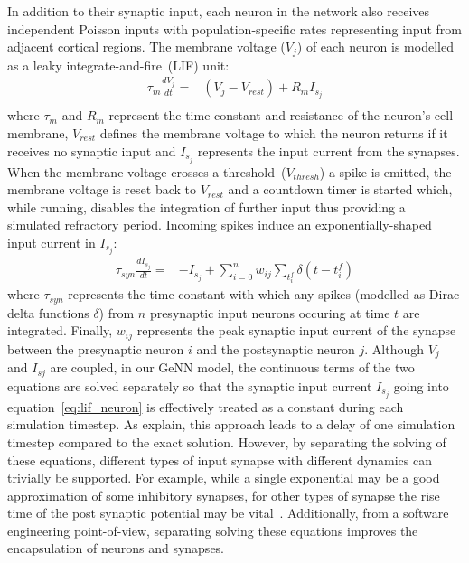\documentclass[utf8]{frontiersSCNS} %
\begin{document}
In addition to their synaptic input, each neuron in the network also receives independent Poisson inputs with population-specific rates representing input from adjacent cortical regions.
The membrane voltage ($V_{j}$) of each neuron is modelled as a leaky integrate-and-fire~(LIF) unit:
%
\begin{align}
    \tau_{m} \frac{dV_{j}}{dt} = & (V_{j} - V_{rest}) + R_{m} I_{s_{j}} \label{eq:lif_neuron}\\
\end{align}
%
where $\tau_{m}$ and $R_{m}$ represent the time constant and resistance of the neuron's cell membrane, $V_{rest}$ defines the membrane voltage to which the neuron returns if it receives no synaptic input and $I_{s_{j}}$ represents the input current from the synapses.
When the membrane voltage crosses a threshold~($V_{thresh}$) a spike is emitted, the membrane voltage is reset back to $V_{rest}$ and a countdown timer is started which, while running, disables the integration of further input thus providing a simulated refractory period.
Incoming spikes induce an exponentially-shaped input current in $I_{s_{j}}$:
%
\begin{align}
    \tau_{syn} \frac{dI_{s_{j}}}{dt} = & -I_{s_{j}} + \sum_{i=0}^{n} w_{ij} \sum_{t_{i}^{f}}  \delta(t - t_{i}^{f})\label{eq:exp_neuron_input_current}
\end{align}
%
where $\tau_{syn}$ represents the time constant with which any spikes (modelled as Dirac delta functions $\delta$) from $n$ presynaptic input neurons occuring at time $t$ are integrated.
Finally, $w_{ij}$ represents the peak synaptic input current of the synapse between the presynaptic neuron $i$ and the postsynaptic neuron $j$.
Although $V_{j}$ and $I_{s{j}}$ are coupled, in our GeNN model, the continuous terms of the two equations are solved separately so that the synaptic input current $I_{s_{j}}$ going into equation~\ref{eq:lif_neuron} is effectively treated as a constant during each simulation timestep.
As \citet{Rotter1999} explain, this approach leads to a delay of one simulation timestep compared to the exact solution.
However, by separating the solving of these equations, different types of input synapse with different dynamics can trivially be supported.
For example, while a single exponential may be a good approximation of some inhibitory synapses, for other types of synapse the rise time of the post synaptic potential may be vital~\citep{VanVreeswijk1994}.
Additionally, from a software engineering point-of-view, separating solving these equations improves the encapsulation of neurons and synapses.
\end{document}
